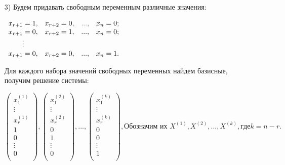 \begin{enumerate}
\begin{enumerate}
        \item[3)] Будем придавать свободным переменным различные значения:

        $\begin{array}{ c c c c } 
            x_{r+1} = 1, & x_{r+2} = 0, & ..., & x_n = 0;\\ 
            x_{r+1} = 0, & x_{r+2} = 1, & ..., & x_n = 0;\\ 
            \vdots & & & \\  
            x_{r+1} = 0, & x_{r+2} = 0, & ..., & x_n = 1.\\
           \end{array} $

        Для каждого набора значений свободных переменных найдем базисные, получим решение системы:

        $$ 
        \begin{pmatrix}
            x_1^{(1)}\\
            \vdots\\
            x_r^{(1)}\\
            1\\
            0\\
            \vdots\\
            0\\
        \end{pmatrix}
        , 
        \begin{pmatrix}
            x_1^{(2)}\\
            \vdots\\
            x_r^{(2)}\\
            0\\
            1\\
            \vdots\\
            0\\
        \end{pmatrix}
        , ...,
        \begin{pmatrix}
            x_1^{(k)}\\
            \vdots\\
            x_r^{(k)}\\
            0\\
            0\\
            \vdots\\
            1\\
        \end{pmatrix}, \text{Обозначим их } X^{(1)}, X^{(2)}, ..., X^{(k)}, где k = n - r.
        $$
    \end{enumerate}
    

\end{enumerate}
